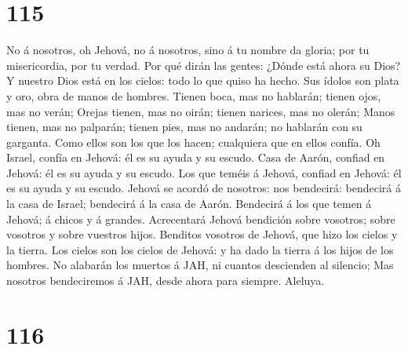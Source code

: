 \hypertarget{section-114}{%
\section{115}\label{section-114}}

 No á nosotros, oh Jehová, no á nosotros, sino á tu nombre
da gloria; por tu misericordia, por tu verdad.  Por qué
dirán las gentes: ¿Dónde está ahora su Dios?  Y nuestro Dios
está en los cielos: todo lo que quiso ha hecho.  Sus ídolos
son plata y oro, obra de manos de hombres.  Tienen boca, mas
no hablarán; tienen ojos, mas no verán;  Orejas tienen, mas
no oirán; tienen narices, mas no olerán;  Manos tienen, mas
no palparán; tienen pies, mas no andarán; no hablarán con su garganta.
 Como ellos son los que los hacen; cualquiera que en ellos
confía.  Oh Israel, confía en Jehová: él es su ayuda y su
escudo.  Casa de Aarón, confiad en Jehová: él es su ayuda y
su escudo.  Los que teméis á Jehová, confiad en Jehová: él
es su ayuda y su escudo.  Jehová se acordó de nosotros: nos
bendecirá: bendecirá á la casa de Israel; bendecirá á la casa de Aarón.
 Bendecirá á los que temen á Jehová; á chicos y á grandes.
 Acrecentará Jehová bendición sobre vosotros; sobre
vosotros y sobre vuestros hijos.  Benditos vosotros de
Jehová, que hizo los cielos y la tierra.  Los cielos son
los cielos de Jehová: y ha dado la tierra á los hijos de los hombres.
 No alabarán los muertos á JAH, ni cuantos descienden al
silencio;  Mas nosotros bendeciremos á JAH, desde ahora
para siempre. Aleluya.

\hypertarget{section-115}{%
\section{116}\label{section-115}}

